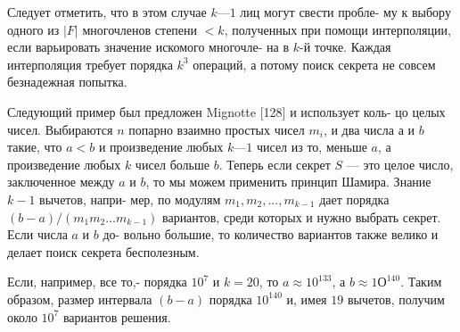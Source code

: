 Следует отметить, что в этом случае $k — 1$ лиц могут свести пробле­-\linebreak
му к выбору одного из $|F|$ многочленов степени $< k$, полученных при\linebreak
помощи интерполяции, если варьировать значение искомого многочле­-\linebreak
на в $k$-й точке. Каждая интерполяция требует порядка $k^3$ операций, а\linebreak
потому поиск секрета не совсем безнадежная попытка.

Следующий пример был предложен Mignotte [128] и использует коль­-\linebreak
цо целых чисел. Выбираются $n$ попарно взаимно простых чисел $m_i$,\linebreak
 и два числа $а$ и $b$ такие, что $a < b$ и произведение любых\linebreak
$k — 1$ чисел из то, меньше $a$, а произведение любых $k$ чисел больше $b$.\linebreak
Теперь если секрет $S$ — это целое число, заключенное между $a$ и $b$, то\linebreak
мы можем применить принцип Шамира. Знание $k - 1$ вычетов, напри­-\linebreak
мер, по модулям $m_1,m_2,...,m_{k-1}$ дает порядка $(b-a)/(m_1m_2...m_{k-1})$\linebreak
вариантов, среди которых и нужно выбрать секрет. Если числа $a$ и $b$ до­-\linebreak
вольно большие, то количество вариантов также велико и делает поиск\linebreak
секрета бесполезным.

Если, например, все то,- порядка $10^7$ и $k = 20$, то $a \approx 10^{133}$, а\linebreak
$b\approx1О^{140}$. Таким образом, размер интервала $(b-a)$ порядка $10^{140}$ и,\linebreak
имея $19$ вычетов, получим около $10^7$ вариантов решения.
